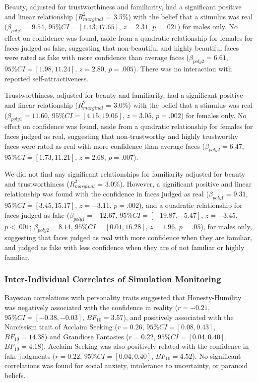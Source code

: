 \documentclass[
  man,floatsintext]{apa6}
\begin{document}
Beauty, adjusted for trustworthiness and familiarity, had a significant positive and linear relationship (\(R^2_{marginal}\) = 3.5\%) with the belief that a stimulus was real (\(\beta_{poly1} = 9.54\), \(95\% CI = [1.43, 17.65]\), \(z = 2.31\), \(p = .021\)) for males only. No effect on confidence was found, aside from a quadratic relationship for females for faces judged as fake, suggesting that non-beautiful and highly beautiful faces were rated as fake with more confidence than average faces (\(\beta_{poly2} = 6.61\), \(95\% CI = [1.98, 11.24]\), \(z = 2.80\), \(p = .005\)). There was no interaction with reported self-attractiveness.

Trustworthiness, adjusted for beauty and familiarity, had a significant positive and linear relationship (\(R^2_{marginal}\) = 3.0\%) with the belief that a stimulus was real (\(\beta_{poly1} = 11.60\), \(95\% CI = [4.15, 19.06]\), \(z = 3.05\), \(p = .002\)) for females only. No effect on confidence was found, aside from a quadratic relationship for females for faces judged as real, suggesting that non-trustworthy and highly trustworthy faces were rated as real with more confidence than average faces (\(\beta_{poly2} = 6.47\), \(95\% CI = [1.73, 11.21]\), \(z = 2.68\), \(p = .007\)).

We did not find any significant relationships for familiarity adjusted for beauty and trustworthiness (\(R^2_{marginal}\) = 3.0\%). However, a significant positive and linear relationship was found with the confidence in faces judged as real (\(\beta_{poly1} = 9.31\), \(95\% CI = [3.45, 15.17]\), \(z = -3.11\), \(p = .002\)), and a quadratic relationship for faces judged as fake (\(\beta_{poly1} = -12.67\), \(95\% CI = [-19.87, -5.47]\), \(z = -3.45\), \(p < .001\); \(\beta_{poly2} = 8.14\), \(95\% CI = [0.01, 16.28]\), \(z = 1.96\), \(p = .05\)), for males only, suggesting that faces judged as real with more confidence when they are familiar, and judged as fake with less confidence when they are of not familiar or highly familiar.

\hypertarget{inter-individual-correlates-of-simulation-monitoring}{%
\subsubsection{Inter-Individual Correlates of Simulation Monitoring}\label{inter-individual-correlates-of-simulation-monitoring}}

Bayesian correlations with personality traits suggested that Honesty-Humility was negatively associated with the confidence in reality (\(r = -0.21\), \(95\% CI = [-0.38, -0.03]\), \(BF_{10} = 3.57\)), and positively associated with the Narcissism trait of Acclaim Seeking (\(r = 0.26\), \(95\% CI = [0.08, 0.43]\), \(BF_{10} = 14.38\)) and Grandiose Fantasies (\(r = 0.22\), \(95\% CI = [0.04, 0.40]\), \(BF_{10} = 4.18\)). Acclaim Seeking was also positively related with the confidence in fake judgments (\(r = 0.22\), \(95\% CI = [0.04, 0.40]\), \(BF_{10} = 4.52\)). No significant correlations was found for social anxiety, intolerance to uncertainty, or paranoid beliefs.
\end{document}
